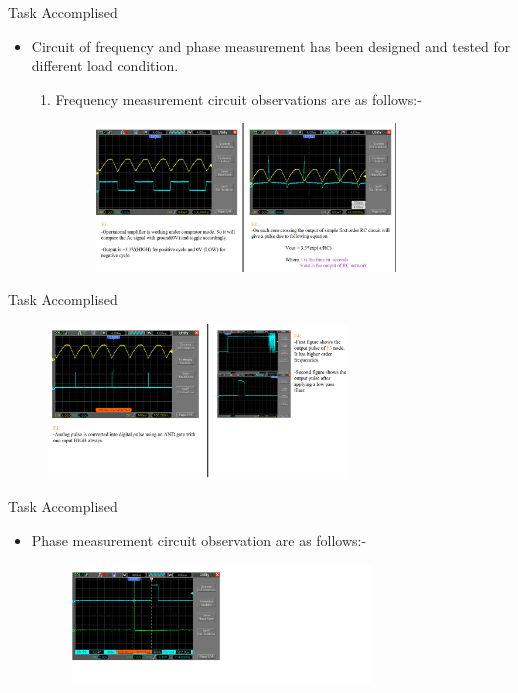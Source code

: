 \documentclass[10pt, a4paper]{beamer}
\begin{document}
\begin{frame}{Task Accomplised}
	\begin{itemize}
		\item Circuit of frequency and phase measurement has been designed and tested for different load condition. 
		\begin{enumerate}
			\item Frequency measurement circuit observations are as follows:-
			 \begin{figure}[h]
			 	\hspace{-2cm}
			 	\includegraphics[width=300px]{freq_circuit1}
			 \end{figure}
		\end{enumerate}
	\end{itemize}
\end{frame}
\begin{frame}{Task Accomplised}
	\begin{figure}[h]
		\includegraphics[width=300px]{freq_circuit2}
	\end{figure}
\end{frame}

\begin{frame}{Task Accomplised}
	\begin{itemize}
		\item Phase measurement circuit observation are as follows:-  
		\begin{figure}[h]
			\includegraphics[width=300px]{phase_circuit}
		\end{figure}
	\end{itemize}
\end{frame}
\end{document}
